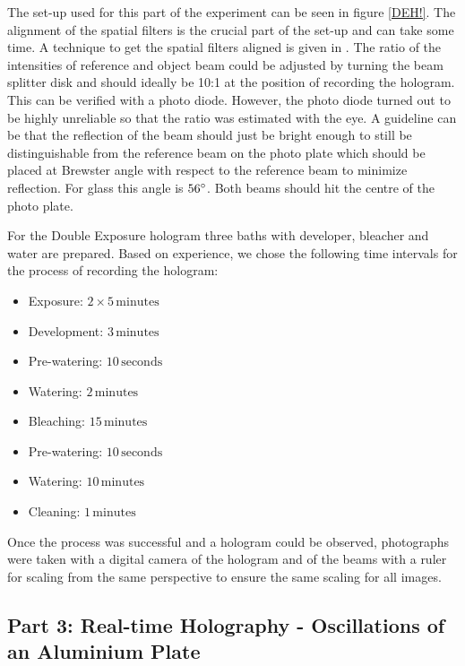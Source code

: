 The set-up used for this part of the experiment can be seen in figure \ref{DEH!}. The alignment of the spatial filters is the crucial part of the set-up and can take some time. A technique to get the spatial filters aligned is given in \cite{anleitung}.
The ratio of the intensities of reference and object beam could be adjusted by turning the beam splitter disk and should ideally be 10:1 at the position of recording the hologram. This can be verified with a photo diode. However, the photo diode turned out to be highly unreliable so that the ratio was estimated with the eye. A guideline can be that the reflection of the beam should just be bright enough to still be distinguishable from the reference beam on the photo plate which should be placed at Brewster angle with respect to the reference beam to minimize reflection. For glass this angle is $56 ^\circ$. Both beams should hit the centre of the photo plate.  


For the Double Exposure hologram three baths with developer, bleacher and water are prepared. Based on experience, we chose the following time intervals for the process of recording the hologram:

\begin{itemize}
	\item Exposure: $2 \times 5\,\mathrm{minutes}$
	\item Development: $3\,\mathrm{minutes}$
	\item Pre-watering: $10\,\mathrm{seconds}$
	\item Watering: $2\,\mathrm{minutes}$
	\item Bleaching: $15\,\mathrm{minutes}$
	\item Pre-watering: $10\,\mathrm{seconds}$
	\item Watering: $10\,\mathrm{minutes}$
	\item Cleaning: $1\,\mathrm{minutes}$
\end{itemize}

Once the process was successful and a hologram could be observed, photographs were taken with a digital camera of the hologram and of the beams with a ruler for scaling from the same perspective to ensure the same scaling for all images.



\subsection{Part 3: Real-time Holography - Oscillations of an Aluminium Plate \label{RTH}}

